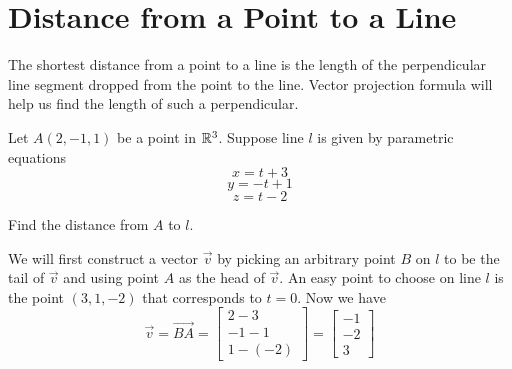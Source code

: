 \documentclass{ximera}
\begin{document}
\section*{Distance from a Point to a Line}

The shortest distance from a point to a line is the length of the perpendicular line segment dropped from the point to the line.  Vector projection formula will help us find the length of such a perpendicular.

\begin{example}
Let $A(2, -1, 1)$ be a point in $\mathbb{R}^3$.  Suppose line $l$ is given by parametric equations $$x=t+3$$
$$y=-t+1$$
$$z=t-2$$

\begin{image}[2in]
\end{image}

Find the distance from $A$ to $l$.
\begin{explanation}
We will first construct a vector $\vec{v}$ by picking an arbitrary point $B$ on $l$ to be the tail of $\vec{v}$ and using point $A$ as the head of $\vec{v}$.  An easy point to choose on line $l$ is the point $(3, 1, -2)$ that corresponds to $t=0$.  Now we have 
$$\vec{v}=\overrightarrow{BA}=\begin{bmatrix}2-3\\-1-1\\1-(-2)\end{bmatrix}=\begin{bmatrix}-1\\-2\\3\end{bmatrix}$$

\begin{image}[2in]
\end{image}


\end{explanation}
\end{example}
\end{document}
